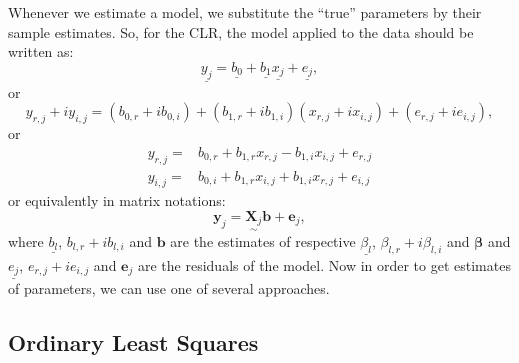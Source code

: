 \documentclass[
]{book}
\begin{document}
Whenever we estimate a model, we substitute the ``true'' parameters by their sample estimates. So, for the CLR, the model applied to the data should be written as:
\begin{equation}
    \underline{y_j} = \underline{b_0} + \underline{b_1} \underline{x_j} + \underline{e_j},
    \label{eq:SimpleCLRComplexEstimated}
\end{equation}
or
\begin{equation}
    y_{r,j}+i y_{i,j} = (b_{0,r} + i b_{0,i}) + (b_{1,r} + i b_{1,i}) (x_{r,j}+i x_{i,j}) + (e_{r,j} + i e_{i,j}),
    \label{eq:SimpleCLREstimated}
\end{equation}
or
\begin{equation}
    \begin{aligned}
        y_{r,j} = & b_{0,r} + b_{1,r} x_{r,j} - b_{1,i} x_{i,j} + e_{r,j} \\
        y_{i,j} = & b_{0,i} + b_{1,r} x_{i,j} + b_{1,i} x_{r,j} + e_{i,j}
    \end{aligned}
    \label{eq:SimpleCLRSystemEstimated}
\end{equation}
or equivalently in matrix notations:
\begin{equation}
    \mathbf{y}_j = \underset{\sim}{\mathbf{X}_j} \boldsymbol{b} + \boldsymbol{e}_j ,
    \label{eq:SimpleCLRSystemVector03Estimated}
\end{equation}
where \(\underline{b_{l}}\), \(b_{l,r}+ib_{l,i}\) and \(\boldsymbol{b}\) are the estimates of respective \(\underline{\beta_l}\), \(\beta_{l,r} + i \beta_{l,i}\) and \(\boldsymbol{\beta}\) and \(\underline{e_j}\), \(e_{r,j} + i e_{i,j}\) and \(\boldsymbol{e}_j\) are the residuals of the model. Now in order to get estimates of parameters, we can use one of several approaches.

\hypertarget{ordinary-least-squares}{%
\subsection{Ordinary Least Squares}\label{ordinary-least-squares}}
\end{document}
